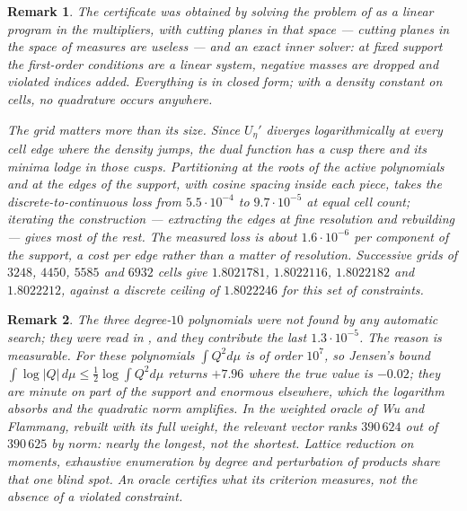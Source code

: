 \documentclass[11pt,a4paper]{article}
\newtheorem{remark}{Remark}
\begin{document}
\begin{remark}
The certificate was obtained by solving the problem of \cite{OTS} as a linear
program in the multipliers, with cutting planes in that space --- cutting planes
in the space of measures are useless --- and an exact inner solver: at fixed
support the first-order conditions are a linear system, negative masses are
dropped and violated indices added. Everything is in closed form; with a
density constant on cells, no quadrature occurs anywhere.

The grid matters more than its size. Since $U_\eta'$ diverges logarithmically at
every cell edge where the density jumps, the dual function has a cusp there and
its minima lodge in those cusps. Partitioning at the roots of the active
polynomials and at the edges of the support, with cosine spacing inside each
piece, takes the discrete-to-continuous loss from $5.5\cdot10^{-4}$ to
$9.7\cdot10^{-5}$ at equal cell count; iterating the construction --- extracting
the edges at fine resolution and rebuilding --- gives most of the rest. The
measured loss is about $1.6\cdot10^{-6}$ per component of the support, a cost
per edge rather than a matter of resolution. Successive grids of $3248$, $4450$,
$5585$ and $6932$ cells give $1.8021781$, $1.8022116$, $1.8022182$ and
$1.8022212$, against a discrete ceiling of $1.8022246$ for this set of
constraints.
\end{remark}

\begin{remark}
The three degree-$10$ polynomials were not found by any automatic search; they
were read in \cite{MS}, and they contribute the last $1.3\cdot10^{-5}$. The
reason is measurable. For these polynomials $\int Q^2 d\mu$ is of order
$10^{7}$, so Jensen's bound $\int\log|Q|\,d\mu\le\frac12\log\int Q^2 d\mu$
returns $+7.96$ where the true value is $-0.02$; they are minute on part of the
support and enormous elsewhere, which the logarithm absorbs and the quadratic
norm amplifies. In the weighted oracle of Wu and Flammang, rebuilt with its full
weight, the relevant vector ranks $390\,624$ out of $390\,625$ by norm: nearly
the longest, not the shortest. Lattice reduction on moments, exhaustive
enumeration by degree and perturbation of products share that one blind spot. An
oracle certifies what its criterion measures, not the absence of a violated
constraint.
\end{remark}
\end{document}
